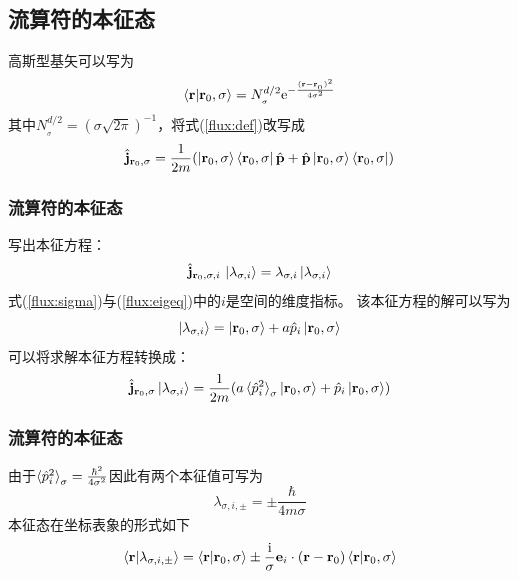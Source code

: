 \documentclass[UTF8]{beamer}
\begin{document}
\subsection{流算符的本征态}
\begin{frame}
	高斯型基矢可以写为
	\begin{equation}
		\braket{\mathbf{r}|\mathbf{r}_0,\sigma}=N_{_\sigma}^{d/2}\mathrm{e}^{-\frac{(\mathbf{r}-\mathbf{r}_{_0})^2}{4\sigma^2}}
	\end{equation}
	其中$N_{_\sigma}^{d/2} = (\sigma\sqrt{2\pi})^{-1}$，将式(\ref{flux:def})改写成
	\begin{equation}
		\hat{\mathbf{j}}_{\mathbf{r}_0,\sigma} = \frac{1}{2m}(\ket{\mathbf{r}_0,\sigma}\bra{\mathbf{r}_0,\sigma}\hat{\mathbf{p}}+\hat{\mathbf{p}}\ket{\mathbf{r}_0,\sigma}\bra{\mathbf{r}_0,\sigma})
		\label{flux:sigma}
	\end{equation}
\end{frame}
\begin{frame}\frametitle{流算符的本征态}
	写出本征方程：
	\begin{equation}
		\hat{\mathbf{j}}_{\mathbf{r}_0,\sigma,i}\,\ket{\lambda_{\sigma,i}}=\lambda_{\sigma,i}\ket{\lambda_{\sigma,i}}
		\label{flux:eigeq}
	\end{equation}
	式(\ref{flux:sigma})与(\ref{flux:eigeq})中的$i$是空间的维度指标。
	该本征方程的解可以写为
	\begin{equation*}
		\ket{\lambda_{\sigma,i}}=\ket{\mathbf{r}_0,\sigma}+a\hat{p}_i\ket{\mathbf{r}_0,\sigma}
	\end{equation*}
	可以将求解本征方程转换成：
	\begin{equation}
		\hat{\mathbf{j}}_{\mathbf{r}_0,\sigma}\ket{\lambda_{\sigma,i}} =
		\frac{1}{2m}(a\braket{\hat{p}_i^2}_{\sigma}\ket{\mathbf{r}_0,\sigma}+\hat{p}_i\ket{\mathbf{r}_0,\sigma})
	\end{equation}
\end{frame}
\begin{frame}\frametitle{流算符的本征态}
	由于$\braket{\hat{p}_i^2}_{\sigma}=\frac{\hbar^2}{4\sigma^2}$因此有两个本征值可写为
	\begin{equation}
		\lambda_{\sigma,i,\pm}=\pm\frac{\hbar}{4m\sigma}
	\end{equation}
	本征态在坐标表象的形式如下
	\begin{equation}
		\braket{\mathbf{r}|\lambda_{\sigma,i,\pm}}=
		\braket{\mathbf{r}|\mathbf{r}_0,\sigma}\pm
		\frac{\mathrm{i}}{\sigma}\mathbf{e}_i\cdot(\mathbf{r}-\mathbf{r}_0)\braket{\mathbf{r}|\mathbf{r}_0,\sigma}
		\label{husimi:eigstate}
	\end{equation}
\end{frame}
\end{document}
